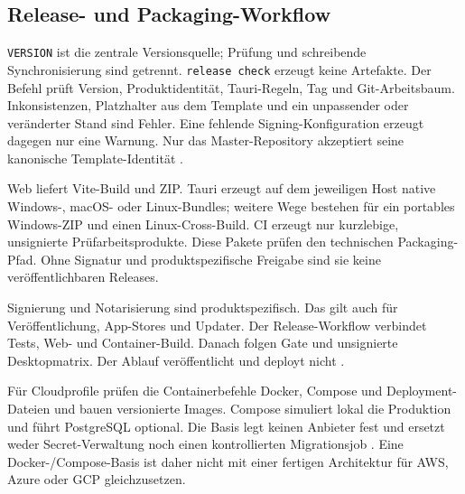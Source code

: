 \subsection{Release- und Packaging-Workflow}
\label{subsec:release-packaging-workflow}

\texttt{VERSION} ist die zentrale Versionsquelle; Prüfung und schreibende
Synchronisierung sind getrennt. \texttt{release check} erzeugt keine
Artefakte. Der Befehl prüft Version, Produktidentität, Tauri-Regeln, Tag und
Git-Arbeitsbaum. Inkonsistenzen, Platzhalter aus dem Template und ein
unpassender oder veränderter Stand sind Fehler. Eine fehlende
Signing-Konfiguration erzeugt dagegen nur eine Warnung.
Nur das Master-Repository akzeptiert seine kanonische Template-Identität
\parencite{kleiveist2026release,kleiveist2026control}.

Web liefert Vite-Build und ZIP. Tauri erzeugt auf dem jeweiligen Host native
Windows-, macOS- oder Linux-Bundles; weitere Wege bestehen für ein portables
Windows-ZIP und einen Linux-Cross-Build. CI erzeugt nur kurzlebige, unsignierte
Prüfarbeitsprodukte.
Diese Pakete prüfen den technischen Packaging-Pfad. Ohne Signatur und
produktspezifische Freigabe sind sie keine veröffentlichbaren Releases.



Signierung und Notarisierung sind produktspezifisch. Das gilt auch für
Veröffentlichung, App-Stores und Updater. Der Release-Workflow verbindet Tests,
Web- und Container-Build. Danach folgen Gate und unsignierte Desktopmatrix. Der
Ablauf veröffentlicht und deployt nicht
\parencite{kleiveist2026release,kleiveist2026ci}.

Für Cloudprofile prüfen die Containerbefehle Docker, Compose und
Deployment-Dateien und bauen versionierte Images. Compose simuliert lokal die
Produktion und führt PostgreSQL optional. Die Basis legt keinen Anbieter fest
und ersetzt weder Secret-Verwaltung noch einen kontrollierten Migrationsjob
\parencite{kleiveist2026container,kleiveist2026deployment}.
Eine Docker-/Compose-Basis ist daher nicht mit einer fertigen Architektur für
AWS, Azure oder GCP gleichzusetzen.
